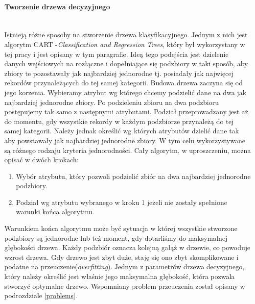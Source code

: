 \paragraph{Tworzenie drzewa decyzyjnego}\mbox{}\\
Istnieją różne sposoby na stworzenie drzewa klasyfikacyjnego. Jednym z nich jest algorytm CART -\textit{Classification  and  Regression  Trees}, który był wykorzystany w tej pracy i jest opisany w tym paragrafie. Ideą tego podejścia jest dzielenie danych wejściowych na rozłączne i dopełniające się podzbiory w taki sposób, aby zbiory te pozostawały jak najbardziej jednorodne tj. posiadały jak najwięcej rekordów przynależących do tej samej kategorii. Budowa drzewa zaczyna się od jego korzenia. Wybieramy atrybut wg którego chcemy podzielić dane na dwa jak najbardziej jednorodne zbiory. Po podzieleniu zbioru na dwa podzbioru postępujemy tak samo z następnymi atrybutami. Podział przeprowadzany jest aż do momentu, gdy wszystkie rekordy w każdym podzbiorze przynależą do tej samej kategorii. Należy jednak określić wg których atrybutów dzielić dane tak aby powstawały jak najbardziej jednorodne zbiory. W tym celu wykorzystywane są różnego rodzaju kryteria jednorodności\cite{CART}. Cały algorytm, w uproszczeniu, można opisać w dwóch krokach:
\begin{enumerate}
\item Wybór atrybutu, który pozwoli podzielić zbiór na dwa najbardziej jednorodne podzbiory.
\item Podział wg atrybutu wybranego w kroku 1 jeżeli nie zostały spełnione warunki końca algorytmu\cite{CART}.
\end{enumerate}
Warunkiem końca algorytmu może być sytuacja w której wszystkie stworzone podzbiory są jednorodne lub też moment, gdy dotarliśmy do maksymalnej głębokości drzewa. Każdy podzbiór oznacza kolejną gałąź w drzewie, co powoduje wzrost drzewa. Gdy drzewo jest zbyt duże, staję się ono zbyt skomplikowane i podatne na przeuczenie(\textit{overfitting}). Jednym z parametrów drzewa decyzyjnego, który należy określić jest właśnie jego maksymalna głębokość, która pozwala stworzyć optymalne drzewo. Wspomniany problem przeuczenia został opisany w podrozdziale \ref{problems}. 

